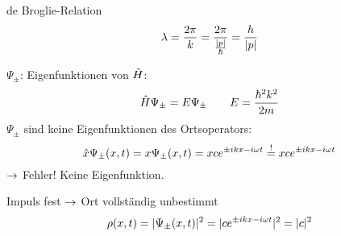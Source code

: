 \begin{enumerate}
    \begin{erl}{de Broglie-Relation}
        \begin{equation*}
            \lambda = \frac{2 \pi}{k} = \frac{2 \pi}{\frac{\lvert p \rvert}{\hbar}}
            = \frac{h}{\lvert p \rvert}
        \end{equation*}
    \end{erl}     
    $\Psi_{\pm}$: Eigenfunktionen von $\hat{H}$:
    \begin{equation*}
        \hat{H}\Psi_{\pm} = E \Psi_{\pm}
        \qquad
        E = \frac{\hbar^2 k^2}{2m}
    \end{equation*}
    $\Psi_{\pm}$ sind keine Eigenfunktionen des Ortsoperators:
    \begin{equation*}
        \hat{x} \Psi_{\pm}(x,t)  
        =
        x \Psi_{\pm}(x,t)
        =
        x c e^{\pm ikx - i\omega t}
        \overset{!}{=}
        x c e^{\pm ikx - i\omega t}
    \end{equation*}
    $\rightarrow$ Fehler! Keine Eigenfunktion.

    Impuls fest $\rightarrow$ Ort vollständig unbestimmt
    \begin{equation*}
        \rho (x,t)
        =
        \lvert \Psi_{\pm} (x,t) \rvert^2
        =
        \lvert c e^{\pm ikx - i\omega t} \rvert^2
        =
        \lvert c \rvert^2
    \end{equation*}
\end{enumerate}

